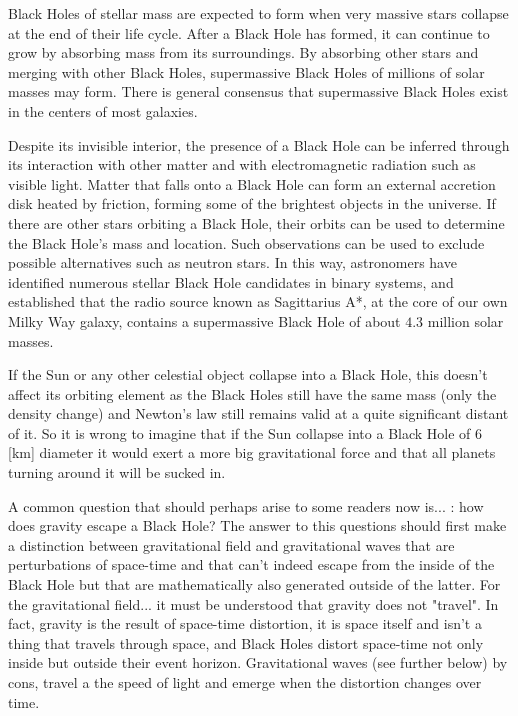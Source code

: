 	Black Holes of stellar mass are expected to form when very massive stars collapse at the end of their life cycle. After a Black Hole has formed, it can continue to grow by absorbing mass from its surroundings. By absorbing other stars and merging with other Black Holes, supermassive Black Holes of millions of solar masses may form. There is general consensus that supermassive Black Holes exist in the centers of most galaxies.

	Despite its invisible interior, the presence of a Black Hole can be inferred through its interaction with other matter and with electromagnetic radiation such as visible light. Matter that falls onto a Black Hole can form an external accretion disk heated by friction, forming some of the brightest objects in the universe. If there are other stars orbiting a Black Hole, their orbits can be used to determine the Black Hole's mass and location. Such observations can be used to exclude possible alternatives such as neutron stars. In this way, astronomers have identified numerous stellar Black Hole candidates in binary systems, and established that the radio source known as Sagittarius A*, at the core of our own Milky Way galaxy, contains a supermassive Black Hole of about $4.3$ million solar masses. 
	\begin{tcolorbox}[title=Remark,colframe=black,arc=10pt]
	If the Sun or any other celestial object collapse into a Black Hole, this doesn't affect its orbiting element as the Black Holes still have the same mass (only the density change) and Newton's law still remains valid at a quite significant distant of it. So it is wrong to imagine that if the Sun collapse into a Black Hole of $6$ [km] diameter it would exert a more big gravitational force and that all planets turning around it will be sucked in.
	\end{tcolorbox}
	A common question that should perhaps arise to some readers now is... : how does gravity escape a Black Hole? The answer to this questions should first make a distinction between gravitational field and gravitational waves that are perturbations of space-time and that can't indeed escape from the inside of the Black Hole but that are mathematically also generated outside of the latter. For the gravitational field... it must be understood that gravity does not "travel". In fact, gravity is the result of space-time distortion, it is space itself and isn't a thing that travels through space, and Black Holes distort space-time not only inside but outside their event horizon. Gravitational waves (see further below) by cons, travel a the speed of light and emerge when the distortion changes over time.
	
